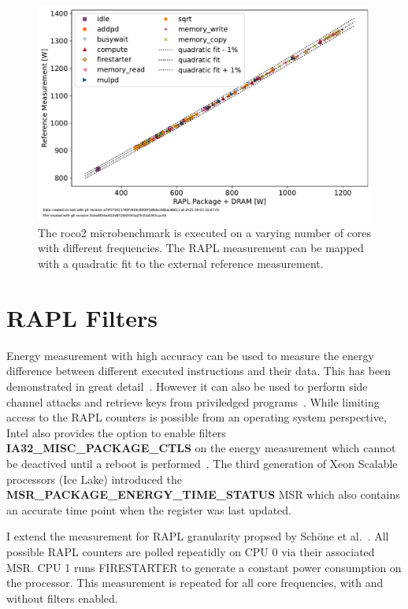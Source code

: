 \begin{figure}[]
    \centering
    \includegraphics[width=0.8\columnwidth]{fig/rapl-accuracy/rapl-accuracy.pdf}
    \caption{\label{fig:validate-rapl}The roco2 microbenchmark is executed on a varying number of cores with different frequencies.
    The RAPL measurement can be mapped with a quadratic fit to the external reference measurement.}
\end{figure}

\section{RAPL Filters}

Energy measurement with high accuracy can be used to measure the energy difference between different executed instructions and their data.
This has been demonstrated in great detail~\cite{Lucas_2016_AluPower,Schoene_2024_Alder_Lake,Schoene_2021_Zen2}.
However it can also be used to perform side channel attacks and retrieve keys from priviledged programs~\cite{Lipp_2021_Platypus}.
While limiting access to the RAPL counters is possible from an operating system perspective, Intel also provides the option to enable filters \textbf{IA32\_MISC\_PACKAGE\_CTLS} on the energy measurement which cannot be deactived until a reboot is performed~\cite[Vol. 4 Table 2-52]{intel_combined_software_developer_manual}.
The third generation of Xeon Scalable processors (Ice Lake) introduced the \textbf{MSR\_PACKAGE\_ENERGY\_TIME\_STATUS} MSR which also contains an accurate time point when the register was last updated.

I extend the measurement for RAPL granularity propsed by Schöne et al.~\cite{Schoene_2024_Alder_Lake}.
All possible RAPL counters are polled repeatidly on CPU 0 via their associated MSR.
CPU 1 runs FIRESTARTER to generate a constant power consumption on the processor.
This measurement is repeated for all core frequencies, with and without filters enabled.


